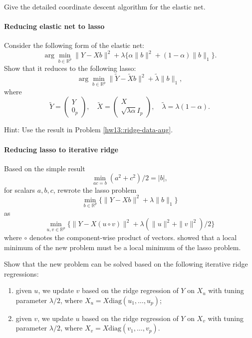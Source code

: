 Give the detailed coordinate descent algorithm for the elastic net. 


\paragraph{Reducing elastic net to lasso}\label{hw14::enet-lasso}


Consider the following form of the elastic net:
$$
\arg\min_{ b \in\mathbb{R}^{p}}  \|  Y -Xb \|^2 + \lambda  \{  \alpha \| b\|^2 + (1-\alpha) \| b \|_1 \} .
$$
Show that it reduces to the following lasso:
$$
\arg\min_{b\in\mathbb{R}^{p}}  \|  \tilde Y -  \tilde Xb \|^2 + \tilde  \lambda  \| b \|_1,
$$
where 
$$
\tilde Y = \begin{pmatrix}
Y \\
0_p
\end{pmatrix},\quad
\tilde X = \begin{pmatrix}
X \\
\sqrt{\lambda \alpha} I_p
\end{pmatrix},\quad
\tilde{\lambda} = \lambda  (1-\alpha).
$$

Hint: Use the result in Problem \ref{hw13::ridge-data-aug}.




\paragraph{Reducing lasso to iterative ridge}\label{hw14::lasso-iterative-ridge} 



Based on the simple result 
$$
\min_{ac=b} (a^2+c^2)/2 = |b|,
$$
for scalars $a,b,c$, \citet{hoff2017lasso} rewrote the lasso problem 
$$
\min_{b\in  \mathbb{R}^p } \{   \| Y-Xb\|^2 + \lambda \|b\|_1 \}
$$
as
$$
\min_{u,v\in  \mathbb{R}^p } \{   \| Y-X(u\circ v)\|^2 + \lambda ( \|u\|^2 + \|v\|^2 )/2 \}
$$
where $\circ$ denotes the component-wise product of vectors. \citet[][Lemma 1]{hoff2017lasso} showed that a local minimum of the new problem must be a local minimum of the lasso problem. 

Show that the new problem can be solved based on the following iterative ridge regressions:
\begin{enumerate}
\item
given $u$, we update $v$ based on the ridge regression of $Y$ on $X_u$ with tuning parameter $\lambda /2$, where $X_u = X \text{diag}(u_1,\ldots, u_p)$;
\item
given $v$, we update $u$ based on the ridge regression of $Y$ on $X_v$ with tuning parameter $\lambda/2$, where $X_v = X \text{diag}(v_1,\ldots, v_p)$.

\end{enumerate}


